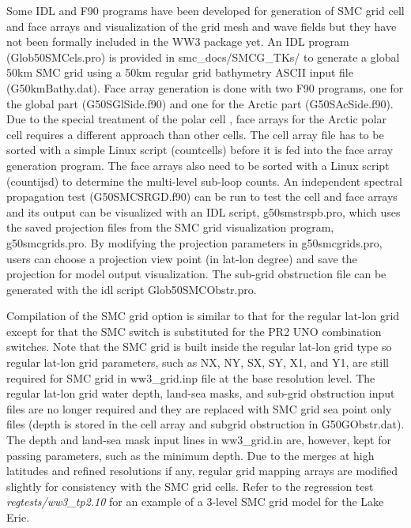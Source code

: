 Some IDL and F90 programs have been developed for generation of SMC grid cell
and face arrays and visualization of the grid mesh and wave fields but they
have not been formally included in the WW3 package yet. An IDL program 
(Glob50SMCels.pro) is provided in smc\_docs/SMCG\_TKs/ to generate a global 50km 
SMC grid using a 50km regular grid bathymetry ASCII input file (G50kmBathy.dat). 
Face array generation is done with two F90 programs, one for the global part 
(G50SGlSide.f90) and one for the Arctic part (G50SAcSide.f90).  Due to the special 
treatment of the polar cell \citep{art:Li12}, face arrays for the Arctic polar cell 
requires a different approach than other cells. The cell array file has to be 
sorted with a simple Linux script (countcells) before it is fed into the face array 
generation program.  The face arrays also need to be sorted with a Linux script 
(countijsd) to determine the multi-level sub-loop counts.  An independent spectral 
propagation test (G50SMCSRGD.f90) can be run to test the cell and face arrays and 
its output can be visualized with an IDL script, g50smstrspb.pro, which uses the 
saved projection files from the SMC grid visualization program, g50smcgrids.pro. 
By modifying the projection parameters in g50smcgrids.pro, users can choose a 
projection view point (in lat-lon degree) and save the projection for model 
output visualization.  The sub-grid obstruction file can be generated with the 
idl script Glob50SMCObstr.pro.

Compilation of the SMC grid option is similar to that for the regular
lat-lon grid except for that the SMC switch is substituted for the
PR2 UNO combination switches. Note that the SMC grid is built inside
the regular lat-lon grid type so regular lat-lon grid parameters,
such as NX, NY, SX, SY, X1, and Y1, are still required for SMC grid
in ww3\_grid.inp file at the base resolution level. The regular lat-lon
grid water depth, land-sea masks, and sub-grid obstruction input files
are no longer required and they are replaced with SMC grid sea point only 
files (depth is stored in the cell array and subgrid obstruction in 
G50GObstr.dat).  The depth and land-sea mask input lines in ww3\_grid.in 
are, however, kept for passing parameters, such as the minimum depth.
Due to the merges at high latitudes and refined resolutions if any,
regular grid mapping arrays are modified slightly for consistency
with the SMC grid cells. 
Refer to the regression test \emph{regtests/ww3\_tp2.10}
for an example of a 3-level SMC grid model for the Lake Erie.


